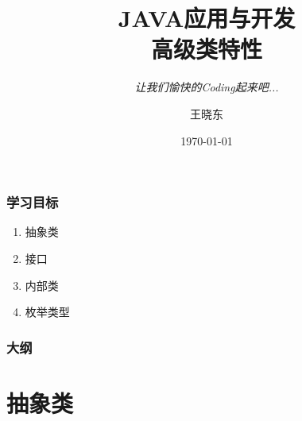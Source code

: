 \documentclass{beamer}
\title{\hei JAVA应用与开发\\  高级类特性}
\subtitle{\it 让我们愉快的Coding起来吧...}
\author{王晓东}
\institute{中国海洋大学信息学院计算机系}
\date{\today}
\begin{document}
\begin{frame}
  \maketitle
\end{frame}

\begin{frame}
  \frametitle{学习目标}
  \begin{enumerate}
  \item 抽象类
  \item 接口
  \item 内部类
  \item 枚举类型
  \end{enumerate}
\end{frame}

\begin{frame}
  \frametitle{大纲}
  \tableofcontents
\end{frame}

\section{抽象类}
\end{document}

